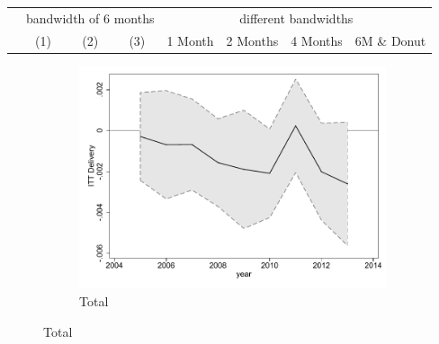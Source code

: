 \documentclass[a4paper ]{article}
\begin{document}
\begin{table}[h]\centering
\def\sym#1{\ifmmode^{#1}\else\(^{#1}\)\fi}
\begin{tabular}{l*{3}{c}|cccc}
\toprule
&\multicolumn{3}{c}{bandwidth of 6 months} & \multicolumn{4}{c}{different bandwidths} \\
 \cmidrule(lr{1em}){2-4} \cmidrule(lr{1em}){5-8}
 &\multicolumn{1}{c}{(1)}&\multicolumn{1}{c}{(2)}&\multicolumn{1}{c}{(3)}& 1 Month & 2 Months & 4 Months & 6M \& Donut \\
\midrule 

\bottomrule
\end{tabular}
\end{table}

\begin{figure}[h!]
	\centering
	\begin{subfigure}[t]{0.5\textwidth}
		\centering
		\includegraphics[width=0.99\textwidth]{R1_LC_Delivery}
		\caption{Total}		
	\end{subfigure}
\end{figure}
\newpage
\end{document}
